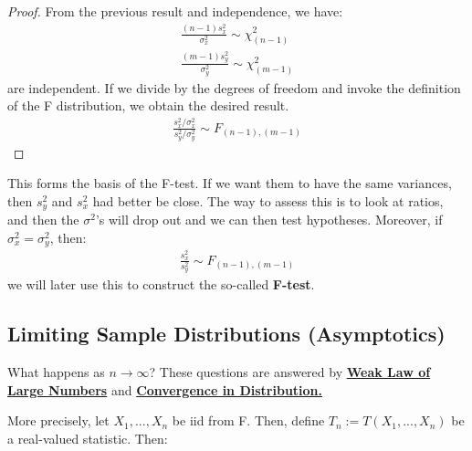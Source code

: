 \documentclass[11pt]{scrartcl}
\theoremstyle{definition}
\theoremstyle{remark}
\newcommand{\dfn}[1]{\textbf{\underline{#1}}}
\newcommand{\stat}[0]{T(X_1, ..., X_n )}
\begin{document}
\begin{proof}
	From the previous result and independence, we have: 
	\begin{align*} 
		\frac{(n-1)s_x^2}{\sigma_x^2} \sim \chi_{(n-1)}^2  \\
		\frac{(m-1)s_y^2}{\sigma_y^2} \sim \chi_{(m-1)}^2
	\end{align*} 
	are independent. If we divide by the degrees of freedom and invoke the definition of the F distribution, we obtain the desired result. 
	\begin{align}
		\frac{s_x^2 / \sigma_x^2}{s_y^2 / \sigma_y^2} \sim F_{(n-1), (m-1)} 
	\end{align}
\end{proof}
	This forms the basis of the F-test. If we want them to have the same variances, then $s_y^2$ and $s_x^2$ had better be close. The way to assess this is to look at ratios, and then the $\sigma^2$'s will drop out and we can then test hypotheses. Moreover, if $\sigma_x^2 = \sigma_y^2$, then: 
	\begin{align*}
		\frac{s_x^2}{s_y^2} \sim F_{(n-1), (m-1)} 
	\end{align*}
	we will later use this to construct the so-called \textbf{F-test}. 
	
	\subsection{Limiting Sample Distributions (Asymptotics)}
	
\begin{center}
	What happens as $n \rightarrow \infty$? These questions are answered by \dfn{Weak Law of Large Numbers} and \dfn{Convergence in Distribution.} 
\end{center}

More precisely, let $X_1, ..., X_n$ be iid from F. Then, define $T_n := \stat$ be a real-valued statistic. Then: 
\end{document}
